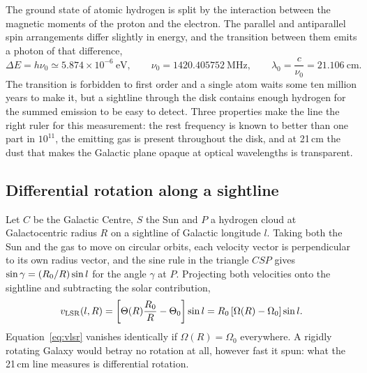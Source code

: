 \documentclass[11pt,a4paper]{article}
\begin{document}
The ground state of atomic hydrogen is split by the interaction between the
magnetic moments of the proton and the electron. The parallel and
antiparallel spin arrangements differ slightly in energy, and the
transition between them emits a photon of that difference,
%
\begin{equation}
\Delta E = h\nu_{0} \simeq 5.874\times10^{-6}\ \mathrm{eV},
\qquad
\nu_{0} = 1420.405752\ \mathrm{MHz},
\qquad
\lambda_{0} = \frac{c}{\nu_{0}} = 21.106\ \mathrm{cm}.
\label{eq:hyperfine}
\end{equation}
%
The transition is forbidden to first order and a single atom waits some ten
million years to make it, but a sightline through the disk contains enough
hydrogen for the summed emission to be easy to detect. Three properties
make the line the right ruler for this measurement: the rest frequency is
known to better than one part in $10^{11}$, the emitting gas is present
throughout the disk, and at 21\,cm the dust that makes the Galactic plane
opaque at optical wavelengths is transparent.


\subsection{Differential rotation along a sightline}
\label{sec:diffrot}

Let $C$ be the Galactic Centre, $S$ the Sun and $P$ a hydrogen cloud at
Galactocentric radius $R$ on a sightline of Galactic longitude $l$. Taking
both the Sun and the gas to move on circular orbits, each velocity vector is
perpendicular to its own radius vector, and the sine rule in the triangle
$CSP$ gives $\sin\gamma = (R_{0}/R)\sin l$ for the angle $\gamma$ at $P$.
Projecting both velocities onto the sightline and subtracting the solar
contribution,
%
\begin{equation}
v_{\mathrm{LSR}}(l,R) = \left[\Theta(R)\frac{R_{0}}{R} - \Theta_{0}\right]\sin l
           = R_{0}\left[\Omega(R) - \Omega_{0}\right]\sin l .
\label{eq:vlsr}
\end{equation}
%
Equation~\eqref{eq:vlsr} vanishes identically if $\Omega(R) = \Omega_{0}$
everywhere. A rigidly rotating Galaxy would betray no rotation at all,
however fast it spun: what the 21\,cm line measures is differential
rotation.
\end{document}
